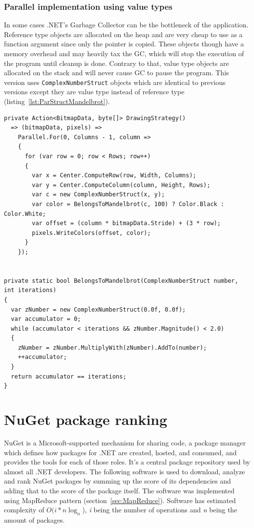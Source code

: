 \subsubsection{Parallel implementation using value types}

In some cases .NET's Garbage Collector can be the bottleneck of the application. Reference type objects are allocated on the heap and are very cheap to use as a function argument since only the pointer is copied. These objects though have a memory overhead and may heavily tax the GC, which will stop the execution of the program until cleanup is done. Contrary to that, value type objects are allocated on the stack and will never cause GC to pause the program. This version uses \texttt{ComplexNumberStruct} objects which are identical to previous versions except they are value type instead of reference type (listing~\ref{lst:ParStructMandelbrot}).

\begin{lstlisting}[style=sharpcstyle, caption={Parallel \texttt{Mandelbrot} algorithm using value types}, label={lst:ParStructMandelbrot},
numbers=none, xleftmargin=0pt,framexleftmargin=0pt,framexrightmargin=0pt,framexbottommargin=0pt]
private Action<BitmapData, byte[]> DrawingStrategy()
  => (bitmapData, pixels) =>
    Parallel.For(0, Columns - 1, column =>
    {
      for (var row = 0; row < Rows; row++)
      {
        var x = Center.ComputeRow(row, Width, Columns);
        var y = Center.ComputeColumn(column, Height, Rows);
        var c = new ComplexNumberStruct(x, y);
        var color = BelongsToMandelbrot(c, 100) ? Color.Black : Color.White;
        var offset = (column * bitmapData.Stride) + (3 * row);
        pixels.WriteColors(offset, color);
      }
    });


private static bool BelongsToMandelbrot(ComplexNumberStruct number, int iterations)
{
  var zNumber = new ComplexNumberStruct(0.0f, 0.0f);
  var accumulator = 0;
  while (accumulator < iterations && zNumber.Magnitude() < 2.0)
  {
    zNumber = zNumber.MultiplyWith(zNumber).AddTo(number);
    ++accumulator;
  }
  return accumulator == iterations;
}

\end{lstlisting}


\section{NuGet package ranking} 
\label{sec: NuGetImp}
NuGet is a Microsoft-supported mechanism for sharing code, a package manager which defines how packages for .NET are created, hosted, and consumed, and provides the tools for each of those roles. It's a central package repository used by almost all .NET developers. The following software is used to download, analyze and rank NuGet packages by summing up the score of its dependencies and adding that to the score of the package itself. The software was implemented using MapReduce pattern (section~\ref{sec:MapReduce}). Software has estimated complexity of $O(i*n\log_n$), \emph{i} being the number of operations and \emph{n} being the amount of packages. 


